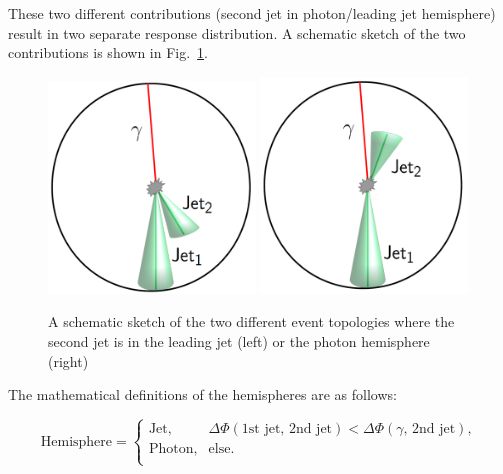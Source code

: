 These two different contributions (second jet in photon/leading jet hemisphere) result in two separate response distribution.
A schematic sketch of the two contributions is shown in \mbox{Fig. \ref{fig:sketch}}. 

\begin{figure}[b]
 \centering
     \includegraphics[width=0.49\textwidth]{figures/resolution/methodology/2ndJet_in_JetHemisphere.pdf}
     \includegraphics[width=0.49\textwidth]{figures/resolution/methodology/2ndJet_in_PhotonHemisphere.pdf}
  \caption{A schematic sketch of the two different event topologies where the second jet is in the leading jet (left) or the photon hemisphere (right)}  
 \label{fig:sketch}
\end{figure}

The mathematical definitions of the hemispheres are as follows:

\begin{equation}\label{eq:HemisphereDefinition}
\text{Hemisphere} = \begin{cases}
  \text{Jet},    & \Delta \Phi \left( \text{1st jet, 2nd jet} \right) < \Delta \Phi \left( \gamma \text{, 2nd jet} \right) , \\
  \text{Photon}, & \text{else}.\\
\end{cases}
\end{equation}

